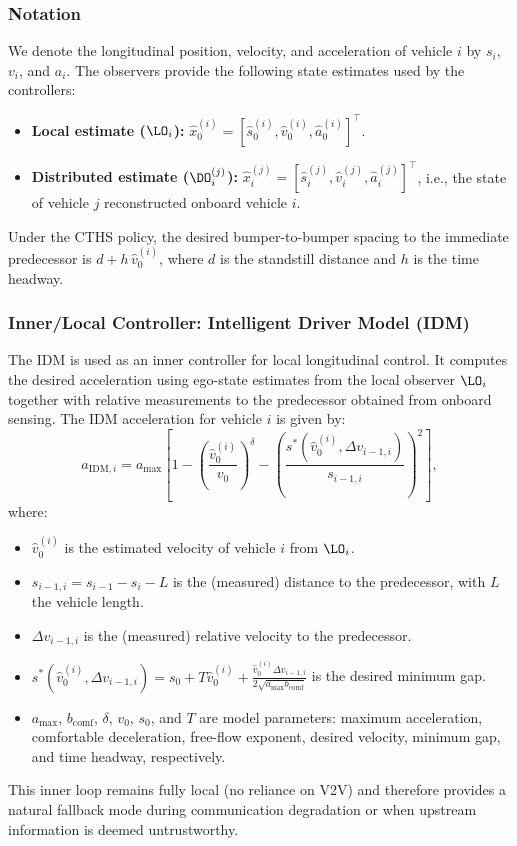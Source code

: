\subsubsection{Notation}
We denote the longitudinal position, velocity, and acceleration of vehicle $i$ by $s_i$, $v_i$, and $a_i$. The observers provide the following state estimates used by the controllers:
\begin{itemize}
    \item \textbf{Local estimate ($\LO_i$):} $\hat{x}_0^{(i)} = [\hat{s}_0^{(i)}, \hat{v}_0^{(i)}, \hat{a}_0^{(i)}]^\top$.
    \item \textbf{Distributed estimate ($\DO_i^{(j)}$):} $\hat{x}_i^{(j)} = [\hat{s}_i^{(j)}, \hat{v}_i^{(j)}, \hat{a}_i^{(j)}]^\top$, i.e., the state of vehicle $j$ reconstructed onboard vehicle $i$.
\end{itemize}
Under the CTHS policy, the desired bumper-to-bumper spacing to the immediate predecessor is $d + h\,\hat{v}_0^{(i)}$, where $d$ is the standstill distance and $h$ is the time headway.

\subsubsection{Inner/Local Controller: Intelligent Driver Model (IDM)}
The IDM is used as an inner controller for local longitudinal control. It computes the desired acceleration using ego-state estimates from the local observer $\LO_i$ together with relative measurements to the predecessor obtained from onboard sensing. The IDM acceleration for vehicle $i$ is given by:
\begin{equation}
    a_{\text{IDM},i} = a_{\max} \left[ 1 - \left( \frac{\hat{v}_0^{(i)}}{v_0} \right)^\delta - \left( \frac{s^*(\hat{v}_0^{(i)}, \Delta v_{i-1,i})}{s_{i-1,i}} \right)^2 \right],
\end{equation}
where:
\begin{itemize}
    \item $\hat{v}_0^{(i)}$ is the estimated velocity of vehicle $i$ from $\LO_i$.
    \item $s_{i-1,i} = s_{i-1} - s_i - L$ is the (measured) distance to the predecessor, with $L$ the vehicle length.
    \item $\Delta v_{i-1,i}$ is the (measured) relative velocity to the predecessor.
    \item $s^*(\hat{v}_0^{(i)}, \Delta v_{i-1,i}) = s_0 + T \hat{v}_0^{(i)} + \frac{\hat{v}_0^{(i)} \Delta v_{i-1,i}}{2 \sqrt{a_{\max} b_{\text{comf}}}}$ is the desired minimum gap.
    \item $a_{\max}$, $b_{\text{comf}}$, $\delta$, $v_0$, $s_0$, and $T$ are model parameters: maximum acceleration, comfortable deceleration, free-flow exponent, desired velocity, minimum gap, and time headway, respectively.
\end{itemize}
This inner loop remains fully local (no reliance on V2V) and therefore provides a natural fallback mode during communication degradation or when upstream information is deemed untrustworthy.

